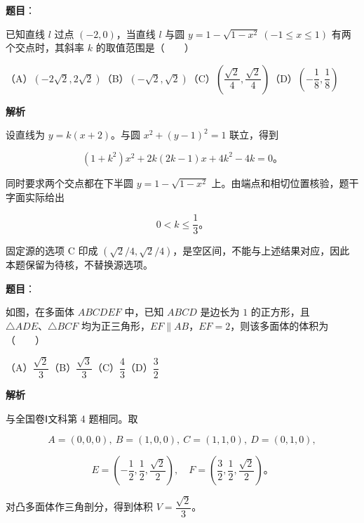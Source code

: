 \begin{answer}

\textbf{题目}：

已知直线 $l$ 过点 $(-2,0)$，当直线 $l$ 与圆 $y=1-\sqrt{1-x^2}\ (-1\leqslant x\leqslant1)$ 有两个交点时，其斜率 $k$ 的取值范围是\mbox{（　　）}

（A）$(-2\sqrt2,2\sqrt2)$\quad（B）$(-\sqrt2,\sqrt2)$\quad（C）$\left(\dfrac{\sqrt2}{4},\dfrac{\sqrt2}{4}\right)$\quad（D）$\left(-\dfrac18,\dfrac18\right)$

\textbf{解析}

设直线为 $y=k(x+2)$。与圆 $x^2+(y-1)^2=1$ 联立，得到

\nopagebreak[4]
\[
(1+k^2)x^2+2k(2k-1)x+4k^2-4k=0\text{。}
\]

同时要求两个交点都在下半圆 $y=1-\sqrt{1-x^2}$ 上。由端点和相切位置核验，题干字面实际给出

\nopagebreak[4]
\[
0<k\leqslant\frac13\text{。}
\]

固定源的选项 C 印成 $(\sqrt2/4,\sqrt2/4)$，是空区间，不能与上述结果对应，因此本题保留为待核，不替换源选项。


\end{answer}
\begin{answer}

\textbf{题目}：

如图，在多面体 $ABCDEF$ 中，已知 $ABCD$ 是边长为 $1$ 的正方形，且 $\triangle ADE\text{、}\triangle BCF$ 均为正三角形，$EF\parallel AB$，$EF=2$，则该多面体的体积为\mbox{（　　）}
\nopagebreak[4]
\begin{center}\end{center}
\nopagebreak[4]
（A）$\dfrac{\sqrt2}{3}$\quad（B）$\dfrac{\sqrt3}{3}$\quad（C）$\dfrac43$\quad（D）$\dfrac32$

\textbf{解析}

与全国卷Ⅰ文科第 4 题相同。取

\nopagebreak[4]
\[
A=(0,0,0),\ B=(1,0,0),\ C=(1,1,0),\ D=(0,1,0),
\]

\nopagebreak[4]
\[
E=\left(-\frac12,\frac12,\frac{\sqrt2}{2}\right),\quad
F=\left(\frac32,\frac12,\frac{\sqrt2}{2}\right)\text{。}
\]

对凸多面体作三角剖分，得到体积 $V=\dfrac{\sqrt2}{3}$。


\end{answer}
